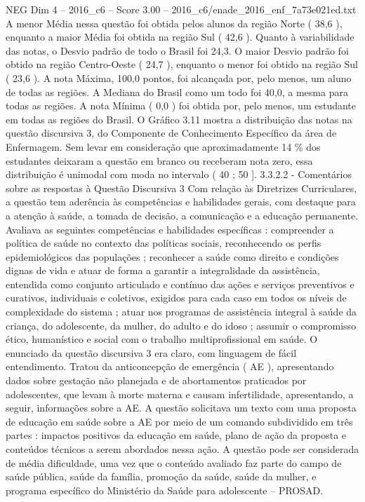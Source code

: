 \begin{textsample}{NEG Dim 4 – 2016\_c6 – Score 3.00 – 2016\_c6/enade\_2016\_enf\_7a73e021ed.txt}
A menor Média nessa questão foi obtida pelos alunos da região Norte ( 38,6 ), enquanto a maior Média foi obtida na região Sul ( 42,6 ).
Quanto à variabilidade das notas, o Desvio padrão de todo o Brasil foi 24,3.
O maior Desvio padrão foi obtido na região Centro-Oeste ( 24,7 ), enquanto o menor foi obtido na região Sul ( 23,6 ).
A nota Máxima, 100,0 pontos, foi alcançada por, pelo menos, um aluno de todas as regiões.
A Mediana do Brasil como um todo foi 40,0, a mesma para todas as regiões.
A nota Mínima ( 0,0 ) foi obtida por, pelo menos, um estudante em todas as regiões do Brasil.
O Gráfico 3.11 mostra a distribuição das notas na questão discursiva 3, do Componente de Conhecimento Específico da área de Enfermagem.
Sem levar em consideração que aproximadamente 14 \% dos estudantes deixaram a questão em branco ou receberam nota zero, essa distribuição é unimodal com moda no intervalo ( 40 ; 50 ]. 3.3.2.2 - Comentários sobre as respostas à Questão Discursiva 3 Com relação às Diretrizes Curriculares, a questão tem aderência às competências e habilidades gerais, com destaque para a atenção à saúde, a tomada de decisão, a comunicação e a educação permanente.
Avaliava as seguintes competências e habilidades específicas : compreender a política de saúde no contexto das políticas sociais, reconhecendo os perfis epidemiológicos das populações ; reconhecer a saúde como direito e condições dignas de vida e atuar de forma a garantir a integralidade da assistência, entendida como conjunto articulado e contínuo das ações e serviços preventivos e curativos, individuais e coletivos, exigidos para cada caso em todos os níveis de complexidade do sistema ; atuar nos programas de assistência integral à saúde da criança, do adolescente, da mulher, do adulto e do idoso ; assumir o compromisso ético, humanístico e social com o trabalho multiprofissional em saúde.
O enunciado da questão discursiva 3 era claro, com linguagem de fácil entendimento.
Tratou da anticoncepção de emergência ( AE ), apresentando dados sobre gestação não planejada e de abortamentos praticados por adolescentes, que levam à morte materna e causam infertilidade, apresentando, a seguir, informações sobre a AE.
A questão solicitava um texto com uma proposta de educação em saúde sobre a AE por meio de um comando subdividido em três partes : impactos positivos da educação em saúde, plano de ação da proposta e conteúdos técnicos a serem abordados nessa ação.
A questão pode ser considerada de média dificuldade, uma vez que o conteúdo avaliado faz parte do campo de saúde pública, saúde da família, promoção da saúde, saúde da mulher, e programa específico do Ministério da Saúde para adolescente – PROSAD.

\end{textsample}
